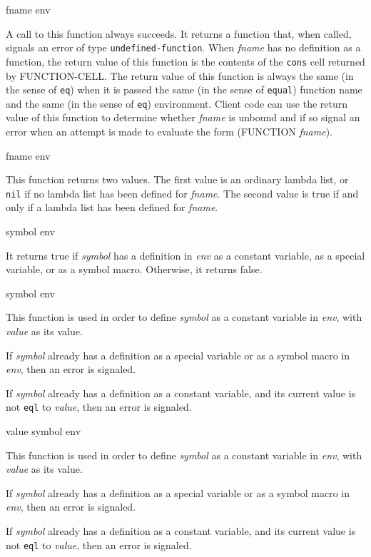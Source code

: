  {fname env}

A call to this function always succeeds.  It returns a function
that, when called, signals an error of type \texttt{undefined-function}.
When \textit{fname} has no definition as a function, the return
value of this function is the contents of the \texttt{cons} cell returned
by FUNCTION-CELL.  The return value of this function is always the
same (in the sense of \texttt{eq}) when it is passed the same (in the sense
of \texttt{equal}) function name and the same (in the sense of \texttt{eq})
environment.  Client code can use the return value of this
function to determine whether \textit{fname} is unbound and if so
signal an error when an attempt is made to evaluate the form
(FUNCTION \textit{fname}).

 {fname env}

This function returns two values.  The first value is an ordinary
lambda list, or \texttt{nil} if no lambda list has been defined for
\textit{fname}.  The second value is true if and only if a lambda
list has been defined for \textit{fname}.

 {symbol env}

It returns true if \textit{symbol} has a definition in \textit{env} as a
constant variable, as a special variable, or as a symbol macro.
Otherwise, it returns false.

 {symbol env}

This function is used in order to define \textit{symbol} as a constant
variable in \textit{env}, with \textit{value} as its value.

If \textit{symbol} already has a definition as a special variable or as a
symbol macro in \textit{env}, then an error is signaled.

If \textit{symbol} already has a definition as a constant variable, and its
current value is not \texttt{eql} to \textit{value}, then an error is signaled.

 {value symbol env}

This function is used in order to define \textit{symbol} as a constant
variable in \textit{env}, with \textit{value} as its value.

If \textit{symbol} already has a definition as a special variable or as a
symbol macro in \textit{env}, then an error is signaled.

If \textit{symbol} already has a definition as a constant variable, and its
current value is not \texttt{eql} to \textit{value}, then an error is signaled.

